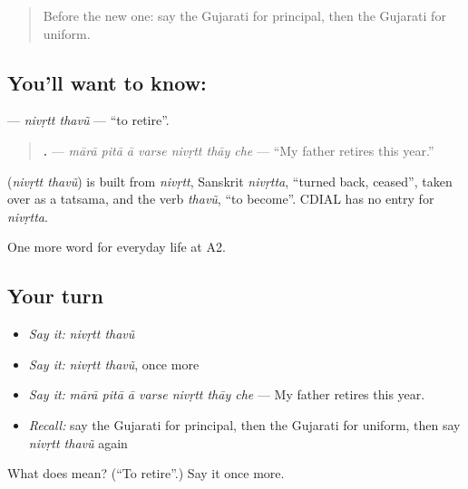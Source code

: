 \label{lesson:GU-C252-nivrtt-thavu}



\begin{quote}
Before the new one: say the Gujarati for principal, then the Gujarati for uniform.
\end{quote}

\subsection*{You'll want to know:  }
\textbf{ } — \emph{nivṛtt thavũ} — \textquotedblleft{}to retire\textquotedblright{}.

\begin{quote}
\textbf{      .} — \emph{mārā pitā ā varse nivṛtt thāy che} — \textquotedblleft{}My father retires this year.\textquotedblright{}
\end{quote}

\begin{cousinweb}
\textbf{ } (\emph{nivṛtt thavũ}) is built from \emph{nivṛtt}, Sanskrit \emph{nivṛtta}, \textquotedblleft{}turned back, ceased\textquotedblright{}, taken over as a tatsama, and the verb \emph{thavũ}, \textquotedblleft{}to become\textquotedblright{}. CDIAL has no entry for \emph{nivṛtta}.
\end{cousinweb}

\begin{grammarlens}[title={What you've built}]
One more word for everyday life at A2.
\end{grammarlens}

\subsection*{Your turn}
\begin{itemize}
\raggedright
  \item \emph{Say it:} \emph{nivṛtt thavũ}
  \item \emph{Say it:} \emph{nivṛtt thavũ}, once more
  \item \emph{Say it:} \emph{mārā pitā ā varse nivṛtt thāy che} — My father retires this year.
  \item \emph{Recall:} say the Gujarati for principal, then the Gujarati for uniform, then say \emph{nivṛtt thavũ} again
\end{itemize}

\begin{tcolorbox}[breakable,colback=teal!4,colframe=teal!35!black,title={Before you move on}]
What does   mean? (\textquotedblleft{}To retire\textquotedblright{}.) Say it once more.
\end{tcolorbox}
